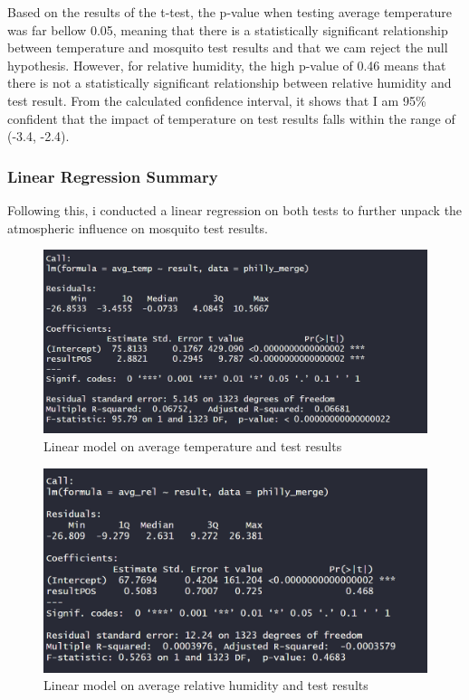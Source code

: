 \documentclass[
  letterpaper,
  DIV=11,
  numbers=noendperiod]{scrartcl}
\begin{document}
Based on the results of the t-test, the p-value when testing average
temperature was far bellow 0.05, meaning that there is a statistically
significant relationship between temperature and mosquito test results
and that we cam reject the null hypothesis. However, for relative
humidity, the high p-value of 0.46 means that there is not a
statistically significant relationship between relative humidity and
test result. From the calculated confidence interval, it shows that I am
95\% confident that the impact of temperature on test results falls
within the range of (-3.4, -2.4).

\hypertarget{linear-regression-summary}{%
\subsubsection{Linear Regression
Summary}\label{linear-regression-summary}}

Following this, i conducted a linear regression on both tests to further
unpack the atmospheric influence on mosquito test results.

\begin{figure}

{\centering \includegraphics{images/Screenshot 2023-12-15 162303.png}

}

\caption{Linear model on average temperature and test results}

\end{figure}

\begin{figure}

{\centering \includegraphics{images/Screenshot 2023-12-15 162349.png}

}

\caption{Linear model on average relative humidity and test results}

\end{figure}
\end{document}
